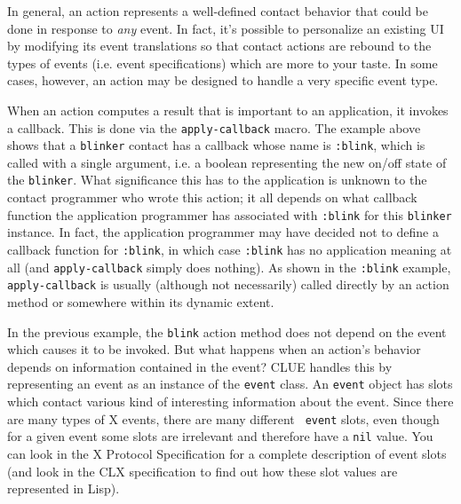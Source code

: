In general, an action represents a well-defined contact behavior that
could be done in
response to {\em any} event. In fact, it's possible to personalize an existing UI by
modifying its event translations so that contact actions are rebound to
the types of events (i.e. event specifications) which
are more to your taste.  In some cases,
however, an action may be designed to handle a very specific event type.

When an action computes a result that is important to an application, it invokes
a callback.
This is done via the {\tt apply-callback} macro.
The example above shows that a {\tt blinker} contact has a callback whose name
is {\tt :blink}, which is called with a single argument, i.e. a boolean
representing the new on/off state of the {\tt blinker}. What significance
this has to the application is unknown to the contact programmer who wrote this
action; it all depends on what callback function the application programmer has
associated with {\tt :blink} for this {\tt blinker} instance.
In fact, the application programmer may have decided not to define a callback
function for {\tt :blink}, in which case {\tt :blink} has no application meaning
at all (and {\tt apply-callback} simply does nothing).
As shown in the {\tt :blink} example,
{\tt apply-callback} is usually (although not
necessarily)
called directly by an action method or somewhere within its dynamic extent.

\begin{center}
\end{center}

In the previous example, the {\tt blink} action method does not depend on the
event which causes it to be invoked.  But what happens when an action's behavior
depends on information contained in the event?  CLUE handles this by
representing an event as an instance of the {\tt event} class.  An {\tt event}
object has slots which contact various kind of interesting information about the
event.  Since there are many types of X events, there are many different {\tt
event} slots, even though for a given event some slots are irrelevant and
therefore have a {\tt nil} value. You can look in the X Protocol Specification for
a complete description of event slots (and look in the CLX specification to find
out how these slot values are represented in Lisp).

